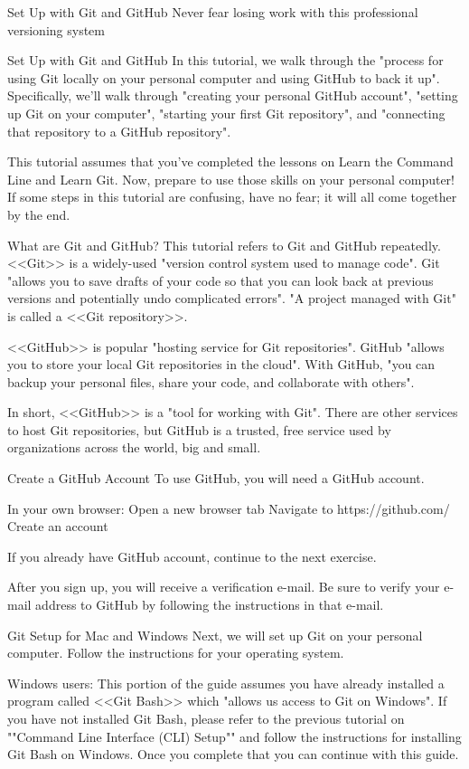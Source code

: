 Set Up with Git and GitHub
        Never fear losing work with this professional versioning system

Set Up with Git and GitHub
        In this tutorial, we walk through the "process for using Git locally on your personal computer and using GitHub to back it up". Specifically, we’ll walk through "creating your personal GitHub account", "setting up Git on your computer", "starting your first Git repository", and "connecting that repository to a GitHub repository".

        This tutorial assumes that you’ve completed the lessons on Learn the Command Line and Learn Git. Now, prepare to use those skills on your personal computer! If some steps in this tutorial are confusing, have no fear; it will all come together by the end.

What are Git and GitHub?
        This tutorial refers to Git and GitHub repeatedly. <<Git>> is a widely-used "version control system used to manage code". Git "allows you to save drafts of your code so that you can look back at previous versions and potentially undo complicated errors". "A project managed with Git" is called a <<Git repository>>.

        <<GitHub>> is popular "hosting service for Git repositories". GitHub "allows you to store your local Git repositories in the cloud". With GitHub, "you can backup your personal files, share your code, and collaborate with others".

        In short, <<GitHub>> is a "tool for working with Git". There are other services to host Git repositories, but GitHub is a trusted, free service used by organizations across the world, big and small.

Create a GitHub Account
        To use GitHub, you will need a GitHub account.

        In your own browser:
            Open a new browser tab
            Navigate to https://github.com/
            Create an account

        If you already have GitHub account, continue to the next exercise.

        After you sign up, you will receive a verification e-mail. Be sure to verify your e-mail address to GitHub by following the instructions in that e-mail.

Git Setup for Mac and Windows
        Next, we will set up Git on your personal computer. Follow the instructions for your operating system.

    Windows users:
        This portion of the guide assumes you have already installed a program called <<Git Bash>> which "allows us access to Git on Windows". If you have not installed Git Bash, please refer to the previous tutorial on ""Command Line Interface (CLI) Setup"" and follow the instructions for installing Git Bash on Windows. Once you complete that you can continue with this guide.

